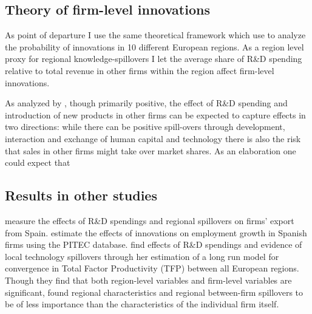 \label{sec:background}
\subsection{Theory of firm-level innovations}
\label{subsec:theory}
As point of departure I use the same theoretical framework which \citet{sternberg2001firm} use to analyze the probability of innovations in 10 different European regions. As a region level proxy for regional knowledge-spillovers I let the average share of R\&D spending relative to total revenue in other firms within the region affect firm-level innovations.

As analyzed by \citet{harrison2014does}, though primarily positive, the effect of R\&D spending and introduction of new products in other firms can be expected to capture effects in two directions: while there can be positive spill-overs through development, interaction and exchange of human capital and technology there is also the risk that sales in other firms might take over market shares. As an elaboration one could expect that

\subsection{Results in other studies}
\label{subsec:other_studies}
\citet{barrios2001explaining} measure the effects of R\&D spendings and regional spillovers on firms' export from Spain. \citet{harrison2014does} estimate the effects of innovations on employment growth in Spanish firms using the PITEC database. \citet{vogel2015two} find effects of R\&D spendings and evidence of local technology spillovers through her estimation of a long run model for convergence in Total Factor Productivity (TFP) between all European regions. Though they find that both region-level variables and firm-level variables are significant, \citet{sternberg2001firm} found regional characteristics and regional between-firm spillovers to be of less importance than the characteristics of the individual firm itself.

